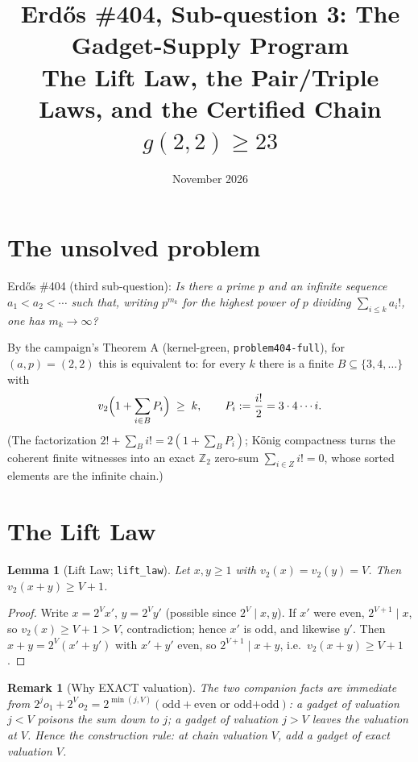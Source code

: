 \documentclass[11pt]{article}
\title{Erd\H{o}s \#404, Sub-question 3: The Gadget-Supply Program\\
\large The Lift Law, the Pair/Triple Laws, and the Certified Chain $g(2,2)\geq 23$}
\date{November 2026}
\newtheorem{lemma}[theorem]{Lemma}
\newtheorem{remark}[theorem]{Remark}
\begin{document}
\maketitle

\section{The unsolved problem}

Erd\H{o}s \#404 (third sub-question): \emph{Is there a prime $p$ and an
infinite sequence $a_1 < a_2 < \cdots$ such that, writing $p^{m_k}$ for the
highest power of $p$ dividing $\sum_{i\le k} a_i!$, one has $m_k \to\infty$?}

By the campaign's Theorem A (kernel-green, \texttt{problem404-full}), for
$(a,p)=(2,2)$ this is equivalent to: for every $k$ there is a finite
$B\subseteq\{3,4,\dots\}$ with
\begin{equation}\label{eq:target}
v_2\Bigl(1+\sum_{i\in B}P_i\Bigr)\;\ge\;k,
\qquad P_i := \frac{i!}{2} = 3\cdot 4\cdots i .
\end{equation}
(The factorization $2!+\sum_B i! = 2(1+\sum_B P_i)$; K\"onig compactness
turns the coherent finite witnesses into an exact $\mathbb{Z}_2$ zero-sum
$\sum_{i\in Z} i! = 0$, whose sorted elements are the infinite chain.)

\section{The Lift Law}

\begin{lemma}[Lift Law; \texttt{lift\_law}]\label{lem:lift}
Let $x,y\ge 1$ with $v_2(x)=v_2(y)=V$. Then $v_2(x+y)\ge V+1$.
\end{lemma}

\begin{proof}
Write $x = 2^V x'$, $y = 2^V y'$ (possible since $2^V\mid x,y$). If
$x'$ were even, $2^{V+1}\mid x$, so $v_2(x)\ge V+1>V$, contradiction; hence
$x'$ is odd, and likewise $y'$. Then
$x+y = 2^V(x'+y')$ with $x'+y'$ even, so $2^{V+1}\mid x+y$, i.e.\
$v_2(x+y)\ge V+1$.
\end{proof}

\begin{remark}[Why EXACT valuation]
The two companion facts are immediate from
$2^j o_1 + 2^V o_2 = 2^{\min(j,V)}(\text{odd}+\text{even or odd+odd})$:
a gadget of valuation $j<V$ \emph{poisons} the sum down to $j$; a gadget of
valuation $j>V$ leaves the valuation at $V$. Hence the construction rule:
\emph{at chain valuation $V$, add a gadget of exact valuation $V$.}
\end{remark}
\end{document}
